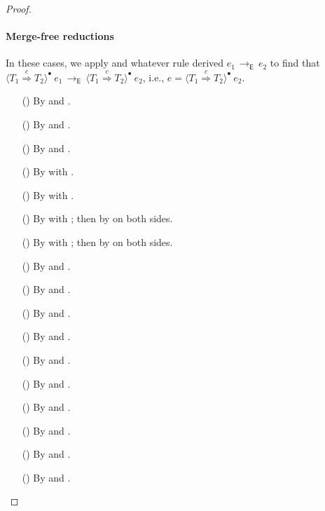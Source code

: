 \documentclass[9pt]{extarticle}
\newcommand{\ottnt}[1]{\mathit{#1}}
\newcommand{\ottsym}[1]{#1}
\begin{document}
\begin{lemma}
\begin{proof}
{    \paragraph{Merge-free reductions}
In these cases, we apply  and whatever rule derived
    $\ottnt{e_{{\mathrm{1}}}} \,  \longrightarrow _{  \mathsf{E}  }  \, \ottnt{e_{{\mathrm{2}}}}$ to find that $ \langle  \ottnt{T_{{\mathrm{1}}}}  \mathord{ \overset{ \ottnt{c} }{\Rightarrow} }  \ottnt{T_{{\mathrm{2}}}}  \rangle^{\bullet} ~  \ottnt{e_{{\mathrm{1}}}}  \,  \longrightarrow _{  \mathsf{E}  }  \,  \langle  \ottnt{T_{{\mathrm{1}}}}  \mathord{ \overset{ \ottnt{c} }{\Rightarrow} }  \ottnt{T_{{\mathrm{2}}}}  \rangle^{\bullet} ~  \ottnt{e_{{\mathrm{2}}}} $, i.e., $\ottnt{e}  \ottsym{=}   \langle  \ottnt{T_{{\mathrm{1}}}}  \mathord{ \overset{ \ottnt{c} }{\Rightarrow} }  \ottnt{T_{{\mathrm{2}}}}  \rangle^{\bullet} ~  \ottnt{e_{{\mathrm{2}}}} $.
\begin{itemize}
    \item[(\E{Beta})] By  and .
    \item[(\E{Op})] By  and .
    \item[(\E{Unwrap})] By  and .
    \item[(\E{AppL})] By  with .
    \item[(\E{AppR})] By  with .
    \item[(\E{AppRaiseL})] By  with ; then
      by  on both sides.
    \item[(\E{AppRaiseR})] By  with ; then
      by  on both sides.
    \item[(\E{Coerce})] By  and .
    \item[(\E{StackDone})] By  and .
    \item[(\E{StackPop})] By  and .
    \item[(\E{StackInner})] By  and .
    \item[(\E{StackRaise})] By  and .
    \item[(\E{CheckOK})] By  and .
    \item[(\E{CheckFail})] By  and .
    \item[(\E{CheckFail})] By  and .
    \item[(\E{OpInner})] By  and .
    \item[(\E{OpRaise})] By  and .


\end{itemize}}
\end{proof}
\end{lemma}
\end{document}
